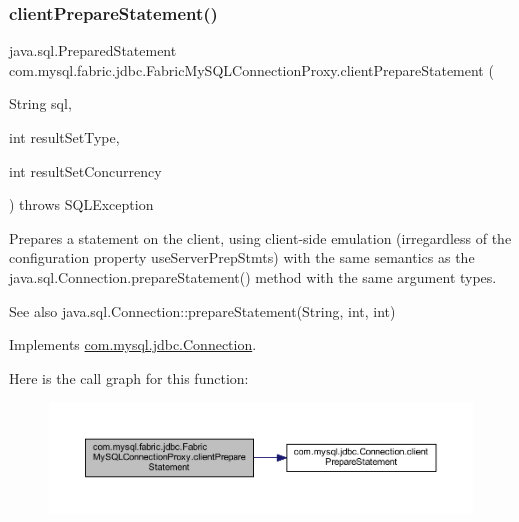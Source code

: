 \subsubsection{\texorpdfstring{client\+Prepare\+Statement()}{clientPrepareStatement()}\hspace{0.1cm}{\footnotesize\ttfamily [3/6]}}
{\footnotesize\ttfamily java.\+sql.\+Prepared\+Statement com.\+mysql.\+fabric.\+jdbc.\+Fabric\+My\+S\+Q\+L\+Connection\+Proxy.\+client\+Prepare\+Statement (\begin{DoxyParamCaption}\item[{String}]{sql,  }\item[{int}]{result\+Set\+Type,  }\item[{int}]{result\+Set\+Concurrency }\end{DoxyParamCaption}) throws S\+Q\+L\+Exception}

Prepares a statement on the client, using client-\/side emulation (irregardless of the configuration property \textquotesingle{}use\+Server\+Prep\+Stmts\textquotesingle{}) with the same semantics as the java.\+sql.\+Connection.\+prepare\+Statement() method with the same argument types.

\begin{DoxySeeAlso}{See also}
java.\+sql.\+Connection\+::prepare\+Statement(\+String, int, int) 
\end{DoxySeeAlso}


Implements \mbox{\hyperlink{interfacecom_1_1mysql_1_1jdbc_1_1_connection_a3d058c3722d0afd1cdc4254a9b813c74}{com.\+mysql.\+jdbc.\+Connection}}.

Here is the call graph for this function\+:\nopagebreak
\begin{figure}[H]
\begin{center}
\leavevmode
\includegraphics[width=350pt]{classcom_1_1mysql_1_1fabric_1_1jdbc_1_1_fabric_my_s_q_l_connection_proxy_a60a88d30678ff7c99831615f3b3a4a1b_cgraph}
\end{center}
\end{figure}
\mbox{\label{classcom_1_1mysql_1_1fabric_1_1jdbc_1_1_fabric_my_s_q_l_connection_proxy_ad03b65c83fb47a910ad616cc4fd360dd}} 
